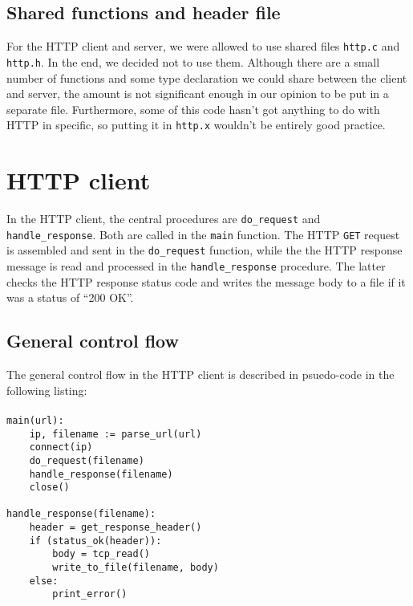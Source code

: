 \documentclass[11pt]{article}
\begin{document}
\subsection{Shared functions and header file}

For the HTTP client and server, we were allowed to use shared files
\lstinline|http.c| and \lstinline|http.h|. In the end, we decided not to use
them. Although there are a small number of functions and some type declaration
we could share between the client and server, the amount is not significant
enough in our opinion to be put in a separate file. Furthermore, some of this
code hasn't got anything to do with HTTP in specific, so putting it in
\lstinline|http.x| wouldn't be entirely good practice.


\section{HTTP client}

In the HTTP client, the central procedures are \lstinline|do_request| and
\lstinline|handle_response|. Both are called in the \lstinline|main|
function. The HTTP \lstinline|GET| request is assembled and sent in the
\lstinline|do_request| function, while the the HTTP response message is read and
processed in the \lstinline|handle_response| procedure. The latter checks the
HTTP response status code and writes the message body to a file if it was a
status of ``200 OK''.


\subsection{General control flow}

The general control flow in the HTTP client is described in psuedo-code in the
following listing:

\paragraph{}

\begin{lstlisting}[title=HTTP client control flow]
main(url):
    ip, filename := parse_url(url)
    connect(ip)
    do_request(filename)
    handle_response(filename)
    close()

handle_response(filename):
    header = get_response_header()
    if (status_ok(header)):
        body = tcp_read()
        write_to_file(filename, body)
    else:
        print_error()
\end{lstlisting}
\end{document}
